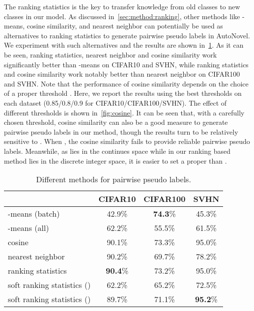 The ranking statistics is the key to transfer knowledge from old classes to new classes in our model.
As discussed in~\cref{sec:method:ranking}, other methods like -means, cosine similarity, and nearest neighbor can potentially be used as alternatives to ranking statistics to generate pairwise pseudo labels in AutoNovel.
We experiment with such alternatives and the results are shown in~\cref{tab:diff_pairwise}.
As it can be seen, ranking statistics, nearest neighbor and cosine similarity work significantly better than -means on CIFAR10 and SVHN, while ranking statistics and cosine similarity work notably better than nearest neighbor on CIFAR100 and SVHN.
Note that the performance of cosine similarity depends on the choice of a proper threshold .
Here, we report the results using the best thresholds on each dataset (0.85/0.8/0.9 for CIFAR10/CIFAR100/SVHN).
The effect of different thresholds is shown in~\cref{fig:cosine}.
It can be seen that, with a carefully chosen threshold, cosine similarity can also be a good measure to generate pairwise pseudo labels in our method, though the results turn to be relatively sensitive to .
When , the cosine similarity fails to provide reliable pairwise pseudo labels.
Meanwhile, as  lies in the continues space while  in our ranking based method lies in the discrete integer space, it is easier to set a proper  than .

\begin{table}[h!]
\centering
\footnotesize
\caption{Different methods for pairwise pseudo labels.}\label{tab:diff_pairwise}
\begin{tabular}{lccc}
\toprule{}
& CIFAR10 & CIFAR100 & SVHN  \\
\midrule
-means (batch) &42.9\%  &\textbf{74.3}\% &45.3\% \\
-means (all) &62.2\%  &55.5\% &61.5\% \\
cosine & 90.1\% &73.3\% & 95.0\% \\
nearest neighbor & 90.2\% &69.7\% & 78.2\% \\
ranking statistics & \textbf{90.4}\%  &73.2\% & 95.0\% \\
\midrule
soft ranking statistics () & 62.2\%  &65.2\% & 72.5\% \\
soft ranking statistics ()& 89.7\%  &71.1\% & \textbf{95.2}\% \\
\bottomrule
\end{tabular}
\end{table}

